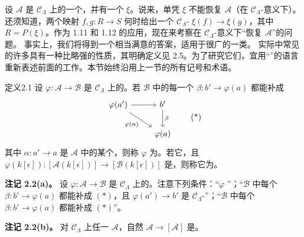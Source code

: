 设 $\mathcal A$ 是 $\mathcal C_\Lambda$ 上的一个，并有一个 $\xi$。说来，单凭 $\xi$ 不能恢复 $\mathcal A$（在 $\mathcal C_\Lambda$-意义下）。还须知道，两个映射 $f,g:R\to S$ 何时给出一个 $\mathcal C_\Lambda$- $\xi(f)\to\xi(g)$，其中 $R=P(\xi)$。作为 1.11 和 1.12 的应用，现在来考察在 $\mathcal C_\Lambda$-意义下“恢复 $\mathcal A$”的问题。
事实上，我们将得到一个相当满意的答案，适用于很广的一类。
实际中常见的许多具有一种比略强的性质，其明确定义见 2.5。为了研究它们，宜用“”的语言重新表述前面的工作。本节始终沿用上一节的所有记号和术语。
\begin{SGAresult}{定义}{2.1}
设 $\varphi:\mathcal A\to\mathcal B$ 是 $\mathcal C_\Lambda$ 上的。若 $\mathcal B$ 中的每一个 $\beta:b'\to\varphi(a)$ 都能补成
\[
\begin{tikzcd}
\varphi(a')\arrow[r]\arrow[dr,"\varphi(\alpha)"']&b'\arrow[d,"\beta"]\\
&\varphi(a)
\end{tikzcd}\tag{*}
\]
其中 $\alpha:a'\to a$ 是 $\mathcal A$ 中的某个，则称 $\varphi$ 为。若它，且
$\varphi(k[\epsilon]):[\mathcal A(k[\epsilon])]\to[\mathcal B(k[\epsilon])]$ 是，则称它为。
\end{SGAresult}
\textbf{注记 2.2(a)。} 设 $\varphi:\mathcal A\to\mathcal B$ 是 $\mathcal C_\Lambda$ 上的。注意下列条件：“$\varphi$ ”；“$\mathcal B$ 中每个 $\beta:b'\to\varphi(a)$ 都能补成 $(*)$，且 $\varphi(a')\to b'$ 是 $\mathcal C_\Lambda$-”；“$\mathcal B$ 中每个 $\beta:b'\to\varphi(a)$ 都能补成 $(*)$”。

\textbf{注记 2.2(b)。} 对 $\mathcal C_\Lambda$ 上任一 $\mathcal A$，自然 $\mathcal A\to[\mathcal A]$ 是。

